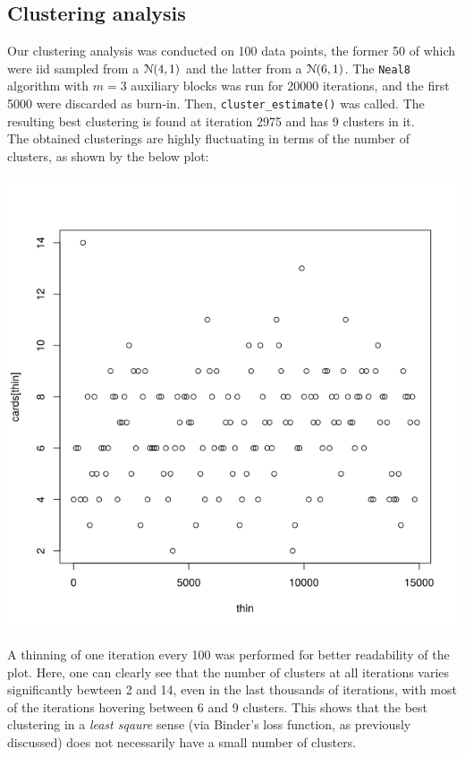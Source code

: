 \subsection{Clustering analysis}
Our clustering analysis was conducted on 100 data points, the former 50 of which were iid sampled from a $\mathcal N(4,1)$ and the latter from a $\mathcal N(6,1)$.
The \verb|Neal8| algorithm with $m=3$ auxiliary blocks was run for 20000 iterations, and the first 5000 were discarded as burn-in. Then, \verb|cluster_estimate()| was called.
The resulting best clustering is found at iteration 2975 and has 9 clusters in it. \\
The obtained clusterings are highly fluctuating in terms of the number of clusters, as shown by the below plot:
\begin{center}
	\includegraphics[scale=0.7]{etc/cardinalities_thinned.png}
\end{center}
A thinning of one iteration every 100 was performed for better readability of the plot.
Here, one can clearly see that the number of clusters at all iterations varies significantly bewteen 2 and 14, even in the last thousands of iterations, with most of the iterations hovering between 6 and 9 clusters.
This shows that the best clustering in a \emph{least sqaure} sense (via Binder's loss function, as previously discussed) does not necessarily have a small number of clusters. \\
